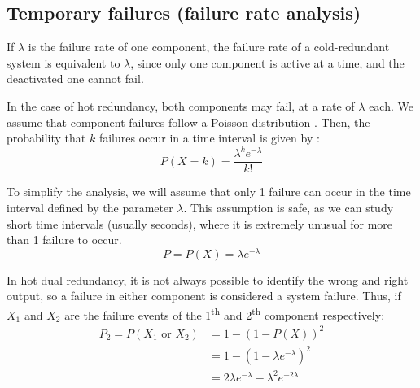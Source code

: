 \documentclass[a4paper,nobib]{tufte-book}
\begin{document}
\subsection{Temporary failures (failure rate analysis)}

If \( \lambda \) is the failure rate of one component, the failure rate of a cold-redundant system is equivalent to \( \lambda \), since only one component is active at a time, and the deactivated one cannot fail.


In the case of hot redundancy, both components may fail, at a rate of \( \lambda \) each. We assume that component failures follow a Poisson distribution \autocite[35]{birolini_reliability_engineering_2004}. Then, the probability that \(k\) failures occur in a time interval is given by \autocite[60]{yates_probability_stochastic_2014}:
	\begin{equation}
	P(X=k) = \frac{\lambda^ke^{-\lambda}}{k!}
	\end{equation}
	

To simplify the analysis, we will assume that only 1 failure can occur in the time interval defined by the parameter \( \lambda \). This assumption is safe, as we can study short time intervals (usually seconds), where it is extremely unusual for more than 1 failure to occur.
	\begin{equation}
	P = P(X) = \lambda e^{-\lambda}
	\end{equation}
	
In hot dual redundancy, it is not always possible to identify the wrong and right output, so a failure in either component is considered a system failure. Thus, if \(X_1\) and \(X_2\) are the failure events of the 1\textsuperscript{th} and 2\textsuperscript{th} component respectively:
\begin{align}
P_2 = P(X_1\text{ or }X_2) &= 1 - (1 - P(X))^2 \nonumber\\
&= 1 - \left(1 - \lambda e^{-\lambda} \right)^2 \nonumber\\
&=  2 \lambda e^{-\lambda} -\lambda^2e^{-2\lambda} \label{eq:lambda}
\end{align}
	
\end{document}
